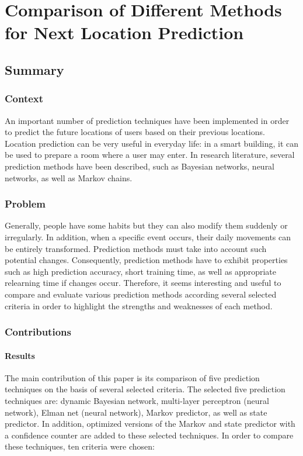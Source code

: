 \newpage
\section{Comparison of Different Methods for Next Location Prediction \cite{conf/europar/PetzoldBTU06}} \label{lect2}

\subsection{Summary} \label{lect2-sum}

\subsubsection{Context}

An important number of prediction techniques have been implemented in order to predict the future locations of users based on their previous locations. Location prediction can be very useful in everyday life: in a smart building, it can be used to prepare a room where a user may enter. In research literature, several prediction methods have been described, such as Bayesian networks, neural networks, as well as Markov chains.

\subsubsection{Problem}

Generally, people have some habits but they can also modify them suddenly or irregularly. In addition, when a specific event occurs, their daily movements can be entirely transformed. Prediction methods must take into account such potential changes. Consequently, prediction methods have to exhibit properties such as high prediction accuracy, short training time, as well as appropriate relearning time if changes occur. Therefore, it seems interesting and useful to compare and evaluate various prediction methods according several selected criteria in order to highlight the strengths and weaknesses of each method.

\subsubsection{Contributions}

\paragraph{Results}
The main contribution of this paper is its comparison of five prediction techniques on the basis of several selected criteria. The selected five prediction techniques are: dynamic Bayesian network, multi-layer perceptron (neural network), Elman net (neural network), Markov predictor, as well as state predictor. In addition, optimized versions of the Markov and state predictor with a confidence counter are added to these selected techniques. In order to compare these techniques, ten criteria were chosen: 

